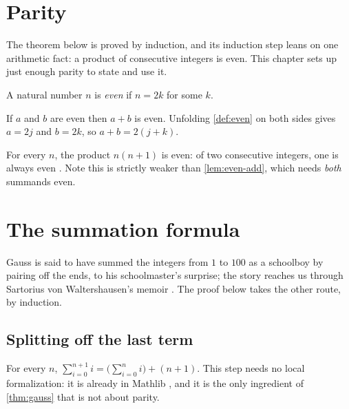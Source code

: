 \documentclass{report}
\begin{document}
\chapter{Parity}

The theorem below is proved by induction, and its induction step leans on one
arithmetic fact: a product of consecutive integers is even. This chapter sets up
just enough parity to state and use it.

\begin{definition}[Even]\label{def:even}\leanok
A natural number $n$ is \emph{even} if $n = 2k$ for some $k$.
\end{definition}

\begin{lemma}\label{lem:even-add}\leanok
If $a$ and $b$ are even then $a + b$ is even. Unfolding \cref{def:even} on both
sides gives $a = 2j$ and $b = 2k$, so $a + b = 2(j + k)$.
\end{lemma}

\begin{lemma}\label{lem:mul-succ}
For every $n$, the product $n(n+1)$ is even: of two consecutive integers, one
is always even \cite{gkp1994concrete}. Note this is strictly weaker than
\cref{lem:even-add}, which needs \emph{both} summands even.
\end{lemma}

\chapter{The summation formula}

Gauss is said to have summed the integers from $1$ to $100$ as a schoolboy by
pairing off the ends, to his schoolmaster's surprise; the story reaches us
through Sartorius von Waltershausen's memoir \cite{waltershausen1856gauss}. The
proof below takes the other route, by induction.

\section{Splitting off the last term}

\begin{lemma}\label{lem:sum-succ}\mathlibok
For every $n$, $\sum_{i=0}^{n+1} i = \bigl(\sum_{i=0}^{n} i\bigr) + (n+1)$.
This step needs no local formalization: it is already in Mathlib
\cite{mathlib2020}, and it is the only ingredient of \cref{thm:gauss} that is
not about parity.
\end{lemma}
\end{document}
